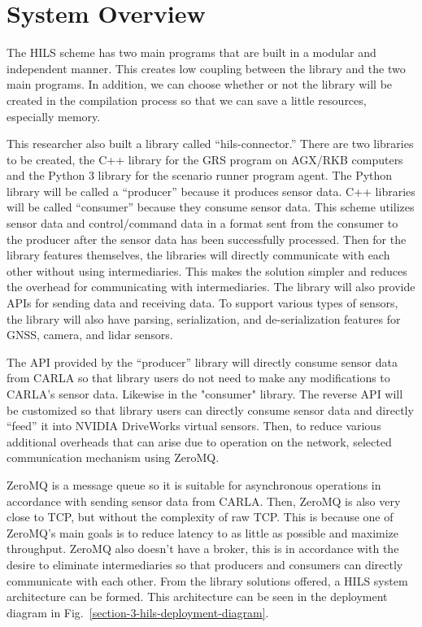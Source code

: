 \section{System Overview}

The HILS scheme has two main programs that are built in a modular and
independent manner. This creates low coupling between the library and the two
main programs. In addition, we can choose whether or not the library will be
created in the compilation process so that we can save a little resources,
especially memory.

This researcher also built a library called ``hils-connector.'' There are two
libraries to be created, the C++ library for the GRS program on AGX/RKB
computers and the Python 3 library for the scenario runner program agent. The
Python library will be called a ``producer'' because it produces sensor data. C++
libraries will be called ``consumer'' because they consume sensor data. This
scheme utilizes sensor data and control/command data in a format sent from the
consumer to the producer after the sensor data has been successfully processed.
Then for the library features themselves, the libraries will directly
communicate with each other without using intermediaries. This makes the
solution simpler and reduces the overhead for communicating with intermediaries.
The library will also provide APIs for sending data and receiving data. To
support various types of sensors, the library will also have parsing,
serialization, and de-serialization features for GNSS, camera, and lidar
sensors.

The API provided by the ``producer'' library will directly consume sensor data
from CARLA so that library users do not need to make any modifications to
CARLA's sensor data. Likewise in the "consumer" library. The reverse API will be
customized so that library users can directly consume sensor data and directly
``feed'' it into NVIDIA DriveWorks virtual sensors. Then, to reduce various
additional overheads that can arise due to operation on the network, selected
communication mechanism using ZeroMQ.

ZeroMQ is a message queue so it is suitable for asynchronous operations in
accordance with sending sensor data from CARLA. Then, ZeroMQ is also very close
to TCP, but without the complexity of raw TCP. This is because one of ZeroMQ's
main goals is to reduce latency to as little as possible and maximize
throughput. ZeroMQ also doesn't have a broker, this is in accordance with the
desire to eliminate intermediaries so that producers and consumers can directly
communicate with each other. From the library solutions offered, a HILS system
architecture can be formed. This architecture can be seen in the deployment
diagram in Fig.~\ref{section-3-hils-deployment-diagram}.

